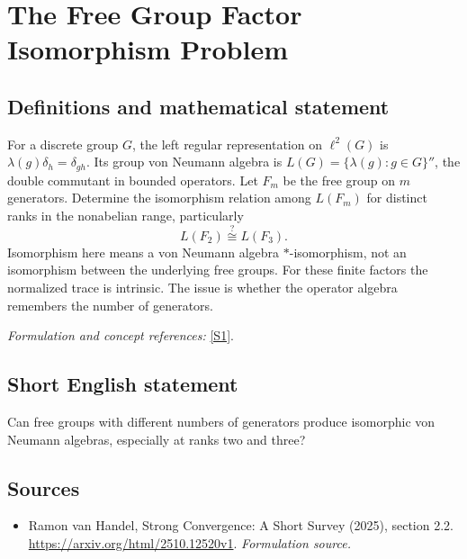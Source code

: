\documentclass[11pt]{article}
\begin{document}
\section*{\texorpdfstring{The Free Group Factor Isomorphism Problem}{The Free Group Factor Isomorphism Problem}}\label{174}
\subsection{Definitions and mathematical statement}
For a discrete group $G$, the left regular representation on $\ell^2(G)$ is $\lambda(g)\delta_h=\delta_{gh}$. Its group von Neumann algebra is
$L(G)=\{\lambda(g):g\in G\}''$, the double commutant in bounded operators. Let $F_m$ be the free group on $m$ generators. Determine the isomorphism relation among $L(F_m)$ for distinct ranks in the nonabelian range, particularly
\[
 L(F_2)\stackrel{?}{\cong}L(F_3).
\]
Isomorphism here means a von Neumann algebra $*$-isomorphism, not an isomorphism between the underlying free groups. For these finite factors the normalized trace is intrinsic. The issue is whether the operator algebra remembers the number of generators.
\par\smallskip\textit{Formulation and concept references:} \href{https://arxiv.org/html/2510.12520v1}{[S1]}.

\subsection{Short English statement}
Can free groups with different numbers of generators produce isomorphic von Neumann algebras, especially at ranks two and three?
\subsection{Sources}
\begin{itemize}
\item[S1]Ramon van Handel, Strong Convergence: A Short Survey (2025), section 2.2.
\url{https://arxiv.org/html/2510.12520v1}.
\textit{Formulation source.}
\end{itemize}
\end{document}
